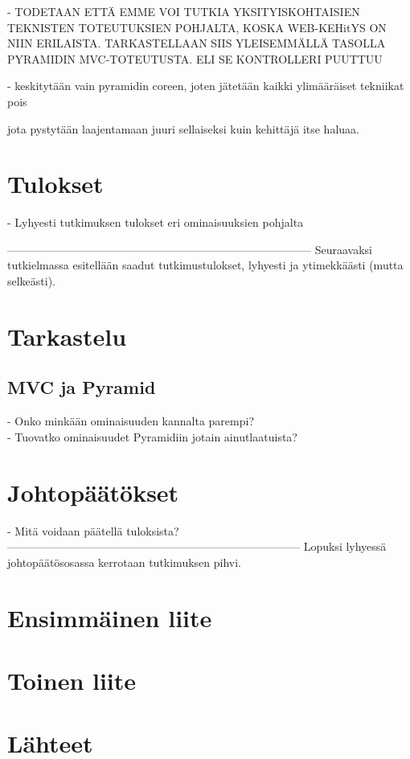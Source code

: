 \documentclass[finnish,utf8,nonumbib,palatino,kandi]{gradu2}
\begin{document}
- TODETAAN ETTÄ EMME VOI TUTKIA YKSITYISKOHTAISIEN TEKNISTEN TOTEUTUKSIEN POHJALTA, KOSKA WEB-KEHitYS ON NIIN ERILAISTA. TARKASTELLAAN
SIIS YLEISEMMÄLLÄ TASOLLA PYRAMIDIN MVC-TOTEUTUSTA. ELI SE KONTROLLERI PUUTTUU

- keskitytään vain pyramidin coreen, joten jätetään kaikki ylimääräiset tekniikat pois


 jota pystytään laajentamaan juuri sellaiseksi
kuin kehittäjä itse haluaa. 



\section{Tulokset}
- Lyhyesti tutkimuksen tulokset eri ominaisuuksien pohjalta


---------------------------------------------------------------------------------
Seuraavaksi tutkielmassa esitellään saadut tutkimustulokset, lyhyesti
ja ytimekkäästi (mutta selkeästi).

\section{Tarkastelu}
\subsection{MVC ja Pyramid}
- Onko minkään ominaisuuden kannalta parempi? \\
- Tuovatko ominaisuudet Pyramidiin jotain ainutlaatuista?

\section{Johtopäätökset}
- Mitä voidaan päätellä tuloksista?
------------------------------------------------------------------------------
Lopuksi lyhyessä johtopäätösosassa kerrotaan tutkimuksen pihvi.




\appendix
\section{Ensimmäinen liite}
\section{Toinen liite}


\section{Lähteet}
\end{document}
